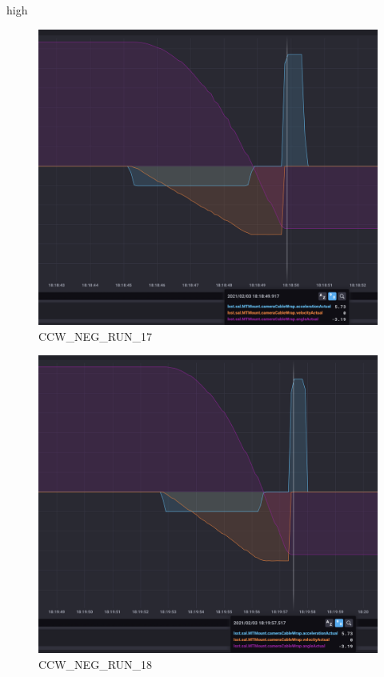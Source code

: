high\documentclass[SE,lsstdraft,authoryear,toc]{lsstdoc}
\begin{document}
\begin{figure}[h!]
  \includegraphics[width=\linewidth]{media/CCW_design_speed_neg_test17.png}
  \caption{CCW\_NEG\_RUN\_17}
  \label{fig:CCW_NEG_RUN_17}
\end{figure}
\begin{figure}[h!]
  \includegraphics[width=\linewidth]{media/CCW_design_speed_neg_test18.png}
  \caption{CCW\_NEG\_RUN\_18}
  \label{fig:CCW_NEG_RUN_18}
\end{figure}
\end{document}
